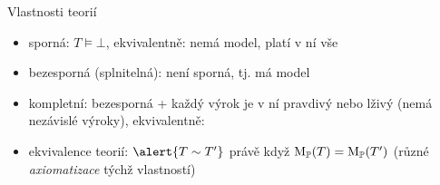 \documentclass{beamer}
\begin{document}
\begin{frame}{Vlastnosti teorií}
 
    \begin{itemize}[<+->]
        \item \alert{sporná}: $T\models\bot$, ekvivalentně: nemá model, platí v ní vše
        \item \alert{bezesporná} (\alert{splnitelná}): není sporná, tj. má model
        \item \alert{kompletní}: bezesporná + každý výrok je v ní pravdivý nebo lživý (nemá nezávislé výroky), ekvivalentně: 
        \item \alert{ekvivalence teorií}: $\alert{T\sim T'}$ právě když $\operatorname{M}_\mathbb P(T)=\operatorname{M}_\mathbb P(T')$ (různé \emph{axiomatizace} týchž vlastností)
    \end{itemize}   


\end{frame}
\end{document}
